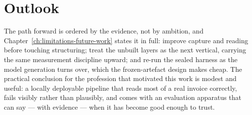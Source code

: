\section*{Outlook}

The path forward is ordered by the evidence, not by ambition, and
Chapter~\ref{ch:limitations-future-work} states it in full: improve capture and
reading before touching structuring; treat the unbuilt layers as the next vertical,
carrying the same measurement discipline upward; and re-run the sealed harness as the
model generation turns over, which the frozen-artefact design makes cheap. The
practical conclusion for the profession that motivated this work is modest and
useful: a locally deployable pipeline that reads most of a real invoice correctly,
fails visibly rather than plausibly, and comes with an evaluation apparatus that can
say --- with evidence --- when it has become good enough to trust.
